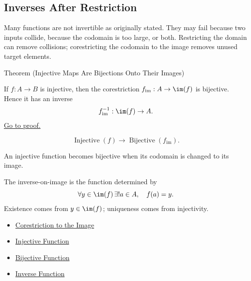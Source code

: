 
\subsection*{Inverses After Restriction}

\begin{remark*}[Exposition]
Many functions are not invertible as originally stated. They may fail because
two inputs collide, because the codomain is too large, or both. Restricting
the domain can remove collisions; corestricting the codomain to the image
removes unused target elements.
\end{remark*}

\begin{theorembox}{Theorem (Injective Maps Are Bijections Onto Their Images)}
\begin{theorem}\label{thm:injective-bijection-onto-image}
If $f:A\to B$ is injective, then the corestriction
$f_{\operatorname{im}}:A\to\im(f)$ is bijective. Hence it has an inverse
\[
f_{\operatorname{im}}^{-1}:\im(f)\to A.
\]
\hyperref[prf:injective-bijection-onto-image]{Go to proof.}
\end{theorem}
\end{theorembox}

\begin{remark*}
\[
  \operatorname{Injective}(f)\to \operatorname{Bijective}(f_{\operatorname{im}}).
\]
\end{remark*}

\begin{remark*}[Interpretation]
An injective function becomes bijective when its codomain is changed to its
image.
\end{remark*}

\begin{remark*}[Exposition]
The inverse-on-image is the function determined by
\[
\forall y\in\im(f)\,\exists! a\in A,\quad f(a)=y.
\]
Existence comes from $y\in\im(f)$; uniqueness comes from injectivity.
\end{remark*}

\begin{dependencies}
\begin{itemize}
  \item \hyperref[def:corestriction-to-image]{Corestriction to the Image}
  \item \hyperref[def:injective]{Injective Function}
  \item \hyperref[def:bijective]{Bijective Function}
  \item \hyperref[def:inverse]{Inverse Function}
\end{itemize}
\end{dependencies}

